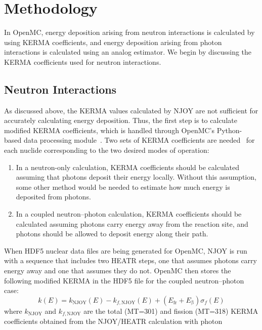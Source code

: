 \documentclass{anstrans}
\newcommand{\efr}{E_\text{fr}}
\newcommand{\eb}{E_\upbeta}
\begin{document}
\section{Methodology}

In OpenMC, energy deposition arising from neutron interactions is calculated by
using KERMA coefficients, and energy deposition arising from photon interactions
is calculated using an analog estimator. We begin by discussing the KERMA
coefficients used for neutron interactions.

\subsection{Neutron Interactions}

As discussed above, the KERMA values calculated by NJOY are not sufficient for
accurately calculating energy deposition. Thus, the first step is to calculate
modified KERMA coefficients, which is handled through OpenMC's Python-based data
processing module~\cite{romano2017epjwoc}. Two sets of KERMA coefficients are
needed~\cite{trumbull2013mc} for each nuclide corresponding to the two desired
modes of operation:
\begin{enumerate}
    \item In a neutron-only calculation, KERMA coefficients should be calculated
    assuming that photons deposit their energy locally. Without this assumption,
    some other method would be needed to estimate how much energy is deposited
    from photons.
    \item In a coupled neutron--photon calculation, KERMA coefficients should be
    calculated assuming photons carry energy away from the reaction site, and
    photons should be allowed to deposit energy along their path.
\end{enumerate}
When HDF5 nuclear data files are being generated for OpenMC, NJOY is run with a
sequence that includes two HEATR steps, one that assumes photons carry energy
away and one that assumes they do not. OpenMC then stores the following modified
KERMA in the HDF5 file for the coupled neutron--photon case:
\begin{equation}
    \label{eq:k}
    k(E) = k_\text{NJOY}(E) - k_{f,\text{NJOY}}(E) + \left ( \efr +
        \eb \right ) \sigma_f(E)
\end{equation}
where $k_\text{NJOY}$ and $k_{f,\text{NJOY}}$ are the total (MT=301) and fission
(MT=318) KERMA coefficients obtained from the NJOY/HEATR calculation with photon
\end{document}
